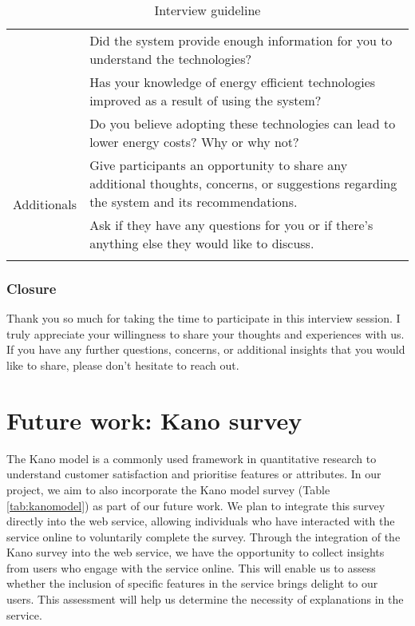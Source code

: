 \begin{center}
\begin{longtable}{ | p{} | p{} | }
    & Did the system provide enough information for you to understand the technologies? \\
    & Has your knowledge of energy efficient technologies improved as a result of using the system? \\
    & Do you believe adopting these technologies can lead to lower energy costs? Why or why not? \\
    \hline
    \multirow{2}{4em}{Additionals} & Give participants an opportunity to share any additional thoughts, concerns, or suggestions regarding the system and its recommendations. \\
    & Ask if they have any questions for you or if there's anything else they would like to discuss. \\
    \hline
  \caption{Interview guideline}
  \label{tab:interview}
  \end{longtable}
\end{center}


\subsubsection{Closure}

Thank you so much for taking the time to participate in this interview session. 
I truly appreciate your willingness to share your thoughts and experiences with us. 
If you have any further questions, concerns, or additional insights that you would like to share, please don't hesitate to reach out.


\section{Future work: Kano survey}

The Kano model \cite{Sauerwein1996} is a commonly used framework in quantitative research to understand customer satisfaction and prioritise features or attributes. 
In our project, we aim to also incorporate the Kano model survey (Table \ref{tab:kanomodel}) as part of our future work. 
We plan to integrate this survey directly into the web service, allowing individuals who have interacted with the service online to voluntarily complete the survey.
Through the integration of the Kano survey into the web service, we have the opportunity to collect insights from users who engage with the service online. 
This will enable us to assess whether the inclusion of specific features in the service brings delight to our users.
This assessment will help us determine the necessity of explanations in the service. 

